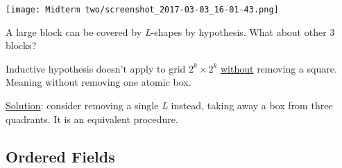 \documentclass[12pt]{article}
\begin{document}
\begin{itemize}
\begin{center}
\texttt{[image: Midterm two/screenshot\_2017-03-03\_16-01-43.png]}
\end{center} A large block can be
covered by \emph{L}-shapes by hypothesis. What about other 3 blocks?

Inductive hypothesis doesn't apply to grid \(2^k\times2^k\) \uline{without}
removing a square. Meaning without removing one atomic box.

\uline{Solution}: consider removing a single \emph{L} instead, taking away a box from
three quadrants. It is an equivalent procedure.
\end{itemize}

\subsection{Ordered Fields}
\label{sec:orgd1c9494}
\end{document}
